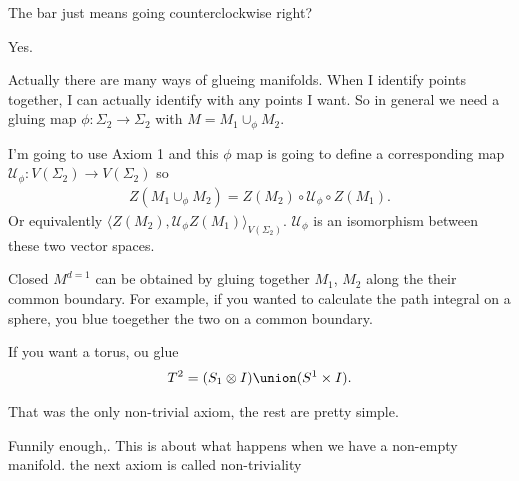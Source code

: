 \begin{question}
    The bar just means going counterclockwise right?
\end{question}
Yes.


Actually there are many ways of glueing manifolds.
When I identify points together,
I can actually identify with any points I want.
So in general we need a gluing map
$\phi: \Sigma_2 \to \Sigma_2$
with
$M = M_1 \cup_\phi M_2$.

I'm going to use Axiom 1
and this $\phi$ map is going to define a corresponding map
$\mathcal{U}_\phi: V(\Sigma_2)\to V(\Sigma_2)$
so
\begin{align}
    Z\left( M_1 \cup_\phi M_2 \right)
    =
    Z(M_2) \circ \mathcal{U}_\phi \circ Z(M_1).
\end{align}
Or equivalently
$\langle Z(M_2), \mathcal{U}_\phi Z(M_1)\rangle_{V(\Sigma_2)}$.
$\mathcal{U}_\phi$ is an isomorphism between these two vector spaces.

Closed $M^{d=1}$
can be obtained by gluing together
$M_1$, $M_2$ along the their common boundary.
For example,
if you wanted to calculate the path integral on a sphere,
you blue toegether the two on a common boundary.

If you want a torus,
ou glue
\begin{align}
    T^2 = (S_1\otimes I) \union (S^1\times I).
\end{align}

That was the only non-trivial axiom,
the rest are pretty simple.

Funnily enough,.
This is about what happens when we have a non-empty manifold.
the next axiom is called non-triviality

